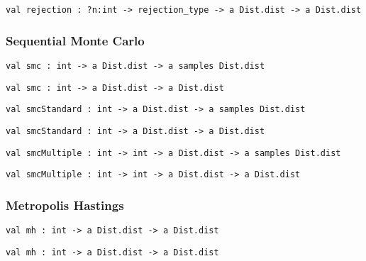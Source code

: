 \protect\hyperlink{val-rejection}{}\texttt{val\ rejection\ :\ ?⁠n:int\ -\textgreater{}\ rejection\_type\ -\textgreater{}\ \textquotesingle{}a\ Dist.dist\ -\textgreater{}\ \textquotesingle{}a\ Dist.dist}

\hypertarget{infux5fsmc}{\subsubsection{\texorpdfstring{\protect\hyperlink{infux5fsmc}{}Sequential
Monte Carlo}{Sequential Monte Carlo}}\label{infux5fsmc}}

\protect\hyperlink{val-smc}{}\texttt{val\ smc\ :\ int\ -\textgreater{}\ \textquotesingle{}a\ Dist.dist\ -\textgreater{}\ \textquotesingle{}a\ samples\ Dist.dist}

\protect\hyperlink{val-smcux27}{}\texttt{val\ smc\textquotesingle{}\ :\ int\ -\textgreater{}\ \textquotesingle{}a\ Dist.dist\ -\textgreater{}\ \textquotesingle{}a\ Dist.dist}

\protect\hyperlink{val-smcStandard}{}\texttt{val\ smcStandard\ :\ int\ -\textgreater{}\ \textquotesingle{}a\ Dist.dist\ -\textgreater{}\ \textquotesingle{}a\ samples\ Dist.dist}

\protect\hyperlink{val-smcStandardux27}{}\texttt{val\ smcStandard\textquotesingle{}\ :\ int\ -\textgreater{}\ \textquotesingle{}a\ Dist.dist\ -\textgreater{}\ \textquotesingle{}a\ Dist.dist}

\protect\hyperlink{val-smcMultiple}{}\texttt{val\ smcMultiple\ :\ int\ -\textgreater{}\ int\ -\textgreater{}\ \textquotesingle{}a\ Dist.dist\ -\textgreater{}\ \textquotesingle{}a\ samples\ Dist.dist}

\protect\hyperlink{val-smcMultipleux27}{}\texttt{val\ smcMultiple\textquotesingle{}\ :\ int\ -\textgreater{}\ int\ -\textgreater{}\ \textquotesingle{}a\ Dist.dist\ -\textgreater{}\ \textquotesingle{}a\ Dist.dist}

\hypertarget{infux5fmh}{\subsubsection{\texorpdfstring{\protect\hyperlink{infux5fmh}{}Metropolis
Hastings}{Metropolis Hastings}}\label{infux5fmh}}

\protect\hyperlink{val-mhux27}{}\texttt{val\ mh\textquotesingle{}\ :\ int\ -\textgreater{}\ \textquotesingle{}a\ Dist.dist\ -\textgreater{}\ \textquotesingle{}a\ Dist.dist}

\protect\hyperlink{val-mhux27ux27}{}\texttt{val\ mh\textquotesingle{}\textquotesingle{}\ :\ int\ -\textgreater{}\ \textquotesingle{}a\ Dist.dist\ -\textgreater{}\ \textquotesingle{}a\ Dist.dist}

